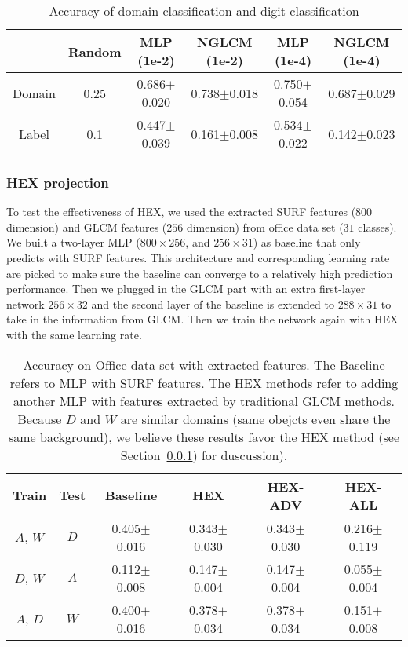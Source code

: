 \begin{table}[]
\centering
\begin{tabular}{cccccc}
\hline
 & Random & MLP (1e-2) & NGLCM (1e-2) & MLP (1e-4) & NGLCM (1e-4) \\ \hline
Domain & 0.25 & 0.686$\pm$0.020 & 0.738$\pm$0.018 & 0.750$\pm$0.054 & 0.687$\pm$0.029 \\
Label & 0.1 & 0.447$\pm$0.039 & 0.161$\pm$0.008 & 0.534$\pm$0.022 & 0.142$\pm$0.023 \\ \hline
\end{tabular}
\caption{Accuracy of domain classification and digit classification}
\label{tab:glcm}
\end{table}

\subsubsection{HEX projection}
\label{sec:exp:basic:hex}

To test the effectiveness of HEX, 
we used the extracted SURF \citep{bay2006surf} features ($800$ dimension) and GLCM \citep{lam1996texture} features ($256$ dimension) 
from office data set \citep{saenko2010adapting} ($31$ classes). 
We built a two-layer MLP ($800 \times 256$, and $256 \times 31$) 
as baseline that only predicts with SURF features. 
This architecture and corresponding learning rate are picked 
to make sure the baseline can converge 
to a relatively high prediction performance. 
Then we plugged in the GLCM part 
with an extra first-layer network $256 \times 32$
and the second layer of the baseline is extended to $288 \times 31$ 
to take in the information from GLCM. 
Then we train the network again with HEX with the same learning rate. 


\begin{table}
\centering
\begin{tabular}{cccccc}
\hline
Train & Test & Baseline & HEX & HEX-ADV & HEX-ALL \\ \hline
$A$, $W$ &$D$ & 0.405$\pm$0.016 & 0.343$\pm$0.030 & 0.343$\pm$0.030 & 0.216$\pm$0.119 \\
$D$, $W$ &$A$ & 0.112$\pm$0.008 & 0.147$\pm$0.004 & 0.147$\pm$0.004 & 0.055$\pm$0.004\\
$A$, $D$ &$W$ & 0.400$\pm$0.016 & 0.378$\pm$0.034 & 0.378$\pm$0.034 & 0.151$\pm$0.008\\ \hline
\end{tabular}
\caption{Accuracy on Office data set with extracted features. 
The Baseline refers to MLP with SURF features. 
The HEX methods refer to adding another MLP with 
features extracted by traditional GLCM methods. 
Because $D$ and $W$ are similar domains (same obejcts even share the same background), 
we believe these results favor the HEX method (see Section~\ref{sec:exp:basic:hex}) for duscussion).}
\label{tab:office}
\end{table}



